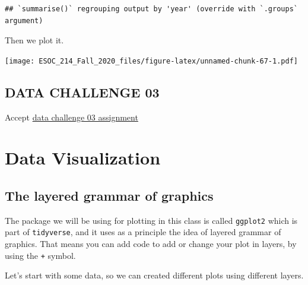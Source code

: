 \documentclass[
]{book}
\newenvironment{Shaded}{\begin{snugshade}}{\end{snugshade}}
\newcommand{\DataTypeTok}[1]{\textcolor[rgb]{0.13,0.29,0.53}{#1}}
\newcommand{\KeywordTok}[1]{\textcolor[rgb]{0.13,0.29,0.53}{\textbf{#1}}}
\newcommand{\NormalTok}[1]{#1}
\newcommand{\OperatorTok}[1]{\textcolor[rgb]{0.81,0.36,0.00}{\textbf{#1}}}
\newcommand{\StringTok}[1]{\textcolor[rgb]{0.31,0.60,0.02}{#1}}
\begin{document}
\begin{verbatim}
## `summarise()` regrouping output by 'year' (override with `.groups` argument)
\end{verbatim}

Then we plot it.

\begin{Shaded}
\end{Shaded}

\texttt{[image: ESOC\_214\_Fall\_2020\_files/figure-latex/unnamed-chunk-67-1.pdf]}

\hypertarget{data-challenge-03}{%
\section{DATA CHALLENGE 03}\label{data-challenge-03}}

Accept \href{https://classroom.github.com/a/DtxQhRcW}{data challenge 03 assignment}

\hypertarget{data-visualization}{%
\chapter{Data Visualization}\label{data-visualization}}

\hypertarget{the-layered-grammar-of-graphics}{%
\section{The layered grammar of graphics}\label{the-layered-grammar-of-graphics}}

The package we will be using for plotting in this class is called \texttt{ggplot2} which is part of \texttt{tidyverse}, and it uses as a principle the idea of layered grammar of graphics. That means you can add code to add or change your plot in layers, by using the \texttt{+} symbol.

Let's start with some data, so we can created different plots using different layers.
\end{document}
